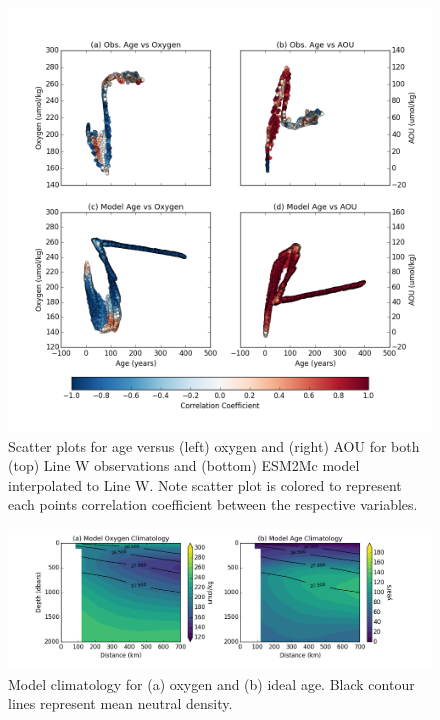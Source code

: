 \documentclass[11pt]{article} %
\begin{document}
\begin{figure}
\noindent
\centering
\includegraphics[width=43pc]{age_oxygen_scatter.png}
\caption{Scatter plots for age versus (left) oxygen and (right)
AOU for both (top) Line W observations and (bottom) ESM2Mc model interpolated to
Line W. Note scatter plot is colored to represent each points correlation coefficient between
the respective variables.}
\label{fig:obs_age_o2_contour}
\end{figure}


\begin{figure}
\noindent
\centering
\includegraphics[width=45pc]{age_oxygen_model_clim.png}
\caption{Model climatology for (a) oxygen and (b) ideal age. Black contour lines
represent mean neutral density. }
\label{fig:obs_age_o2_contour}
\end{figure}
\end{document}

